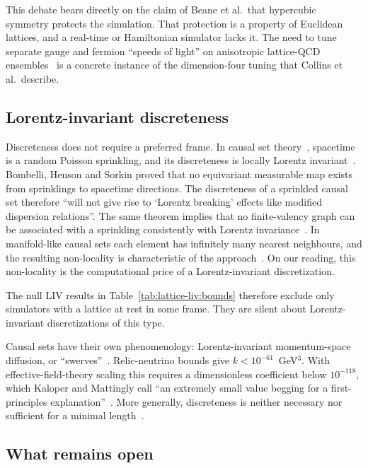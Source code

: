 This debate bears directly on the claim of Beane et al.\ that hypercubic symmetry protects the simulation. That protection is a property of Euclidean lattices, and a real-time or Hamiltonian simulator lacks it. The need to tune separate gauge and fermion ``speeds of light'' on anisotropic lattice-QCD ensembles~\cite{Lin2009first} is a concrete instance of the dimension-four tuning that Collins et al.\ describe.

\subsection{Lorentz-invariant discreteness}
\label{sec:lattice-liv:causal}

Discreteness does not require a preferred frame. In causal set theory~\cite{Bombelli1987space}, spacetime is a random Poisson sprinkling, and its discreteness is locally Lorentz invariant~\cite{Dowker2004quantum}. Bombelli, Henson and Sorkin proved that no equivariant measurable map exists from sprinklings to spacetime directions. The discreteness of a sprinkled causal set therefore ``will not give rise to `Lorentz breaking' effects like modified dispersion relations''. The same theorem implies that no finite-valency graph can be associated with a sprinkling consistently with Lorentz invariance~\cite{Bombelli2009discreteness}. In manifold-like causal sets each element has infinitely many nearest neighbours, and the resulting non-locality is characteristic of the approach~\cite{Surya2019causal}. On our reading, this non-locality is the computational price of a Lorentz-invariant discretization.

The null LIV results in Table~\ref{tab:lattice-liv:bounds} therefore exclude only simulators with a lattice at rest in some frame. They are silent about Lorentz-invariant discretizations of this type.

Causal sets have their own phenomenology: Lorentz-invariant momentum-space diffusion, or ``swerves''~\cite{Dowker2004quantum,Philpott2009energy}. Relic-neutrino bounds give $k<10^{-61}$~GeV$^3$. With effective-field-theory scaling this requires a dimensionless coefficient below $10^{-118}$, which Kaloper and Mattingly call ``an extremely small value begging for a first-principles explanation''~\cite{Kaloper2006low}. More generally, discreteness is neither necessary nor sufficient for a minimal length~\cite{Hossenfelder2013minimal}.

\subsection{What remains open}
\label{sec:lattice-liv:open}

